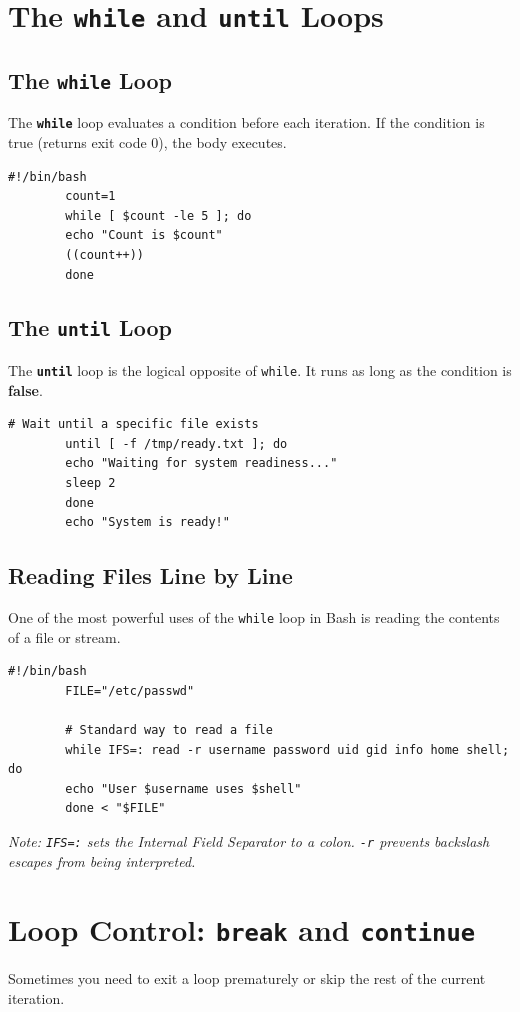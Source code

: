 \documentclass[12pt,a4paper]{article}
\newcommand{\bashcmd}[1]{\texttt{\textbf{#1}}}
\begin{document}
	\section{The \texttt{while} and \texttt{until} Loops}
	
	\subsection{The \texttt{while} Loop}
	The \bashcmd{while} loop evaluates a condition before each iteration. If the condition is true (returns exit code 0), the body executes.
	
	\begin{lstlisting}[caption=Standard while loop]
		#!/bin/bash
		count=1
		while [ $count -le 5 ]; do
		echo "Count is $count"
		((count++))
		done
	\end{lstlisting}
	
	\subsection{The \texttt{until} Loop}
	The \bashcmd{until} loop is the logical opposite of \texttt{while}. It runs as long as the condition is \textbf{false}.
	
	\begin{lstlisting}[caption=Using until for service monitoring]
		# Wait until a specific file exists
		until [ -f /tmp/ready.txt ]; do
		echo "Waiting for system readiness..."
		sleep 2
		done
		echo "System is ready!"
	\end{lstlisting}
	
	\subsection{Reading Files Line by Line}
	One of the most powerful uses of the \texttt{while} loop in Bash is reading the contents of a file or stream.
	
	\begin{lstlisting}[caption=The 'read' loop pattern]
		#!/bin/bash
		FILE="/etc/passwd"
		
		# Standard way to read a file
		while IFS=: read -r username password uid gid info home shell; do
		echo "User $username uses $shell"
		done < "$FILE"
	\end{lstlisting}
	\textit{Note: \texttt{IFS=:} sets the Internal Field Separator to a colon. \texttt{-r} prevents backslash escapes from being interpreted.}
	
	\newpage
	\section{Loop Control: \texttt{break} and \texttt{continue}}
	Sometimes you need to exit a loop prematurely or skip the rest of the current iteration.
	
\end{document}
